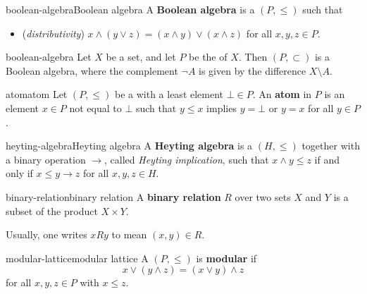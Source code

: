 \begin{topic}{boolean-algebra}{Boolean algebra}
    A \textbf{Boolean algebra} is a  $(P, \le)$ such that
    \begin{itemize}
        \item (\textit{distributivity}) $x \wedge (y \vee z) = (x \wedge y) \vee (x \wedge z)$ for all $x, y, z \in P$.
    \end{itemize}
\end{topic}

\begin{example}{boolean-algebra}
    Let $X$ be a set, and let $P$ be the  of $X$. Then $(P, \subset)$ is a Boolean algebra, where the complement $\neg A$ is given by the difference $X \setminus A$.
\end{example}

\begin{topic}{atom}{atom}
    Let $(P, \le)$ be a  with a least element $\bot \in P$. An \textbf{atom} in $P$ is an element $x \in P$ not equal to $\bot$ such that $y \le x$ implies $y = \bot$ or $y = x$ for all $y \in P$.
\end{topic}

\begin{topic}{heyting-algebra}{Heyting algebra}
    A \textbf{Heyting algebra} is a  $(H, \le)$ together with a binary operation $\rightarrow$, called \textit{Heyting implication}, such that $x \wedge y \le z$ if and only if $x \le y \rightarrow z$ for all $x, y, z \in H$.
\end{topic}

\begin{topic}{binary-relation}{binary relation}
    A \textbf{binary relation} $R$ over two sets $X$ and $Y$ is a subset of the product $X \times Y$.
    
    Usually, one writes $x R y$ to mean $(x, y) \in R$.
\end{topic}

\begin{topic}{modular-lattice}{modular lattice}
    A  $(P, \le)$ is \textbf{modular} if
    \[ x \lor (y \land z) = (x \lor y) \land z \]
    for all $x, y, z \in P$ with $x \le z$.
\end{topic}

